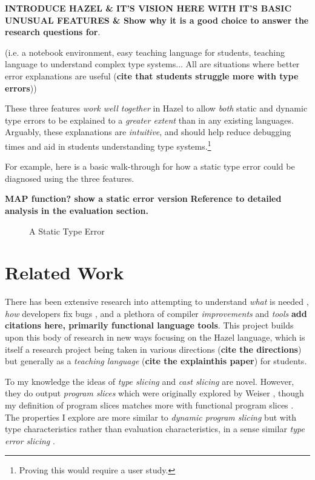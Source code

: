\textbf{INTRODUCE HAZEL \& IT'S VISION HERE WITH IT'S BASIC UNUSUAL FEATURES \& Show why it is a good choice to answer the research questions for}.

(i.e. a notebook environment, easy teaching language for students, teaching language to understand complex type systems... All are situations where better error explanations are useful (\textbf{cite that students struggle more with type errors}))

These three features \textit{work well together} in Hazel to allow \textit{both} static and dynamic type errors to be explained to a \textit{greater extent} than in any existing languages. Arguably, these explanations are \textit{intuitive}, and should help reduce debugging times and aid in students understanding type systems.\footnote{Proving this would require a user study.}

For example, here is a basic walk-through for how a static type error could be diagnosed using the three features. 

\textbf{MAP function? show a static error version}
\textbf{Reference to detailed analysis in the evaluation section.}

\begin{figure}

\caption{A Static Type Error}
\label{sec:CognitiveWalkthrough}
\end{figure}

\section{Related Work}
\label{sec:RelatedWork}
There has been extensive research into attempting to understand \textit{what} is needed \cite{DebugNeeds}, \textit{how} developers fix bugs \cite{HowFixBugs}, and a plethora of compiler \textit{improvements} and \textit{tools} \textbf{add citations here, primarily functional language tools}. This project builds upon this body of research in new ways focusing on the Hazel language, which is itself a research project being taken in various directions (\textbf{cite the directions}) but generally as a \textit{teaching language} (\textbf{cite the explainthis paper}) for students. 

To my knowledge the ideas of \textit{type slicing} and \textit{cast slicing} are novel. However, they do output \textit{program slices} which were originally explored by Weiser \cite{ProgSlice}, though my definition of program slices matches more with functional program slices \cite{FunctionalProgExplain}.  The properties I explore are more similar to \textit{dynamic program slicing} \cite{DynProgSlice} but with type characteristics rather than evaluation characteristics, in a sense similar \textit{type error slicing} \cite{ErrSlice}.

